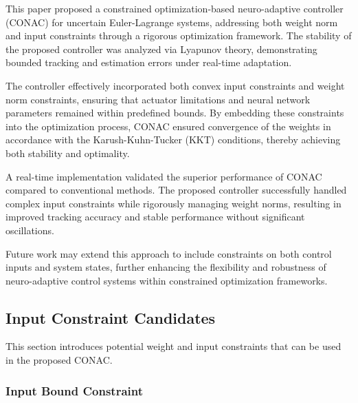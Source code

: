 \documentclass[lettersize,journal]{IEEEtran}
\begin{document}
This paper proposed a constrained optimization-based neuro-adaptive controller (CONAC) for uncertain Euler-Lagrange systems, addressing both weight norm and input constraints through a rigorous optimization framework. 
The stability of the proposed controller was analyzed via Lyapunov theory, demonstrating bounded tracking and estimation errors under real-time adaptation.

The controller effectively incorporated both convex input constraints and weight norm constraints, ensuring that actuator limitations and neural network parameters remained within predefined bounds. 
By embedding these constraints into the optimization process, CONAC ensured convergence of the weights in accordance with the Karush-Kuhn-Tucker (KKT) conditions, thereby achieving both stability and optimality.

A real-time implementation validated the superior performance of CONAC compared to conventional methods. 
The proposed controller successfully handled complex input constraints while rigorously managing weight norms, resulting in improved tracking accuracy and stable performance without significant oscillations.

Future work may extend this approach to include constraints on both control inputs and system states, further enhancing the flexibility and robustness of neuro-adaptive control systems within constrained optimization frameworks.

\appendix

\subsection{Input Constraint Candidates}\label{sec:appen:cstr} 

This section introduces potential weight and input constraints that can be used in the proposed CONAC. 

\subsubsection{Input Bound Constraint}\label{sec:appen:cstr:input:bound}
\end{document}
